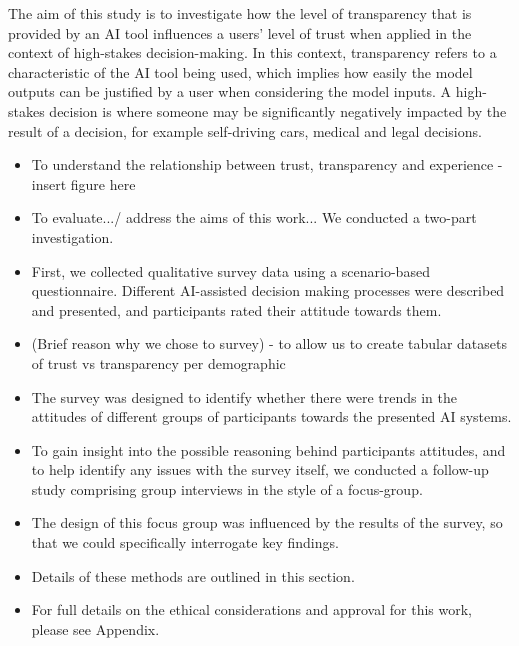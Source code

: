 \documentclass[manuscript,screen,review]{acmart}
\begin{document}

The aim of this study is to investigate how the level of transparency that is provided by an AI tool influences a users' level of trust when applied in the context of high-stakes decision-making. In this context, transparency refers to a characteristic of the AI tool being used, which implies how easily the model outputs can be justified by a user when considering the model inputs. A high-stakes decision is where someone may be significantly negatively impacted by the result of a decision, for example self-driving cars, medical and legal decisions.




\begin{itemize}
\item To understand the relationship between trust, transparency and experience  - insert figure here
\item To evaluate.../ address the aims of this work... We conducted a two-part investigation.
\item First, we collected qualitative survey data using a scenario-based questionnaire. Different AI-assisted decision making processes were described and presented, and participants rated their attitude towards them.
\item (Brief reason why we chose to survey) -  to allow us to create tabular datasets of trust vs transparency per demographic
\end{itemize}
\begin{itemize}
\item The survey was designed to identify whether there were trends in the attitudes of different groups of participants towards the presented AI systems. 
\item To gain insight into the possible reasoning behind participants attitudes, and to help identify any issues with the survey itself, we conducted a follow-up study comprising group interviews in the style of a focus-group.
\item The design of this focus group was influenced by the results of the survey, so that we could specifically interrogate key findings. 
\item Details of these methods are outlined in this section. 
\item For full details on the ethical considerations and approval for this work, please see Appendix.
\end{itemize}
\end{document}
